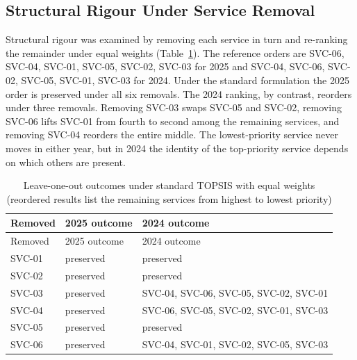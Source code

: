 \documentclass[
  authoryear,
  preprint]{elsarticle}
\begin{document}
\subsection{Structural Rigour Under Service
Removal}\label{sec-rankreversal}

Structural rigour was examined by removing each service in turn and
re-ranking the remainder under equal weights
(Table~\ref{tbl-rankreversal}). The reference orders are SVC-06, SVC-04,
SVC-01, SVC-05, SVC-02, SVC-03 for 2025 and SVC-04, SVC-06, SVC-02,
SVC-05, SVC-01, SVC-03 for 2024. Under the standard formulation the 2025
order is preserved under all six removals. The 2024 ranking, by
contrast, reorders under three removals. Removing SVC-03 swaps SVC-05
and SVC-02, removing SVC-06 lifts SVC-01 from fourth to second among the
remaining services, and removing SVC-04 reorders the entire middle. The
lowest-priority service never moves in either year, but in 2024 the
identity of the top-priority service depends on which others are
present.

\begin{longtable}[]{@{}
  >{\raggedright\arraybackslash}p{}
  >{\raggedright\arraybackslash}p{}
  >{\raggedright\arraybackslash}p{}@{}}
\caption{Leave-one-out outcomes under standard TOPSIS with equal weights
(reordered results list the remaining services from highest to lowest
priority)}\label{tbl-rankreversal}\tabularnewline
\toprule\noalign{}
\begin{minipage}[b]{\linewidth}\raggedright
Removed
\end{minipage} & \begin{minipage}[b]{\linewidth}\raggedright
2025 outcome
\end{minipage} & \begin{minipage}[b]{\linewidth}\raggedright
2024 outcome
\end{minipage} \\
\midrule\noalign{}
\endfirsthead
\toprule\noalign{}
\begin{minipage}[b]{\linewidth}\raggedright
Removed
\end{minipage} & \begin{minipage}[b]{\linewidth}\raggedright
2025 outcome
\end{minipage} & \begin{minipage}[b]{\linewidth}\raggedright
2024 outcome
\end{minipage} \\
\midrule\noalign{}
\endhead
\bottomrule\noalign{}
\endlastfoot
SVC-01 & preserved & preserved \\
SVC-02 & preserved & preserved \\
SVC-03 & preserved & SVC-04, SVC-06, SVC-05, SVC-02, SVC-01 \\
SVC-04 & preserved & SVC-06, SVC-05, SVC-02, SVC-01, SVC-03 \\
SVC-05 & preserved & preserved \\
SVC-06 & preserved & SVC-04, SVC-01, SVC-02, SVC-05, SVC-03 \\
\end{longtable}
\end{document}
